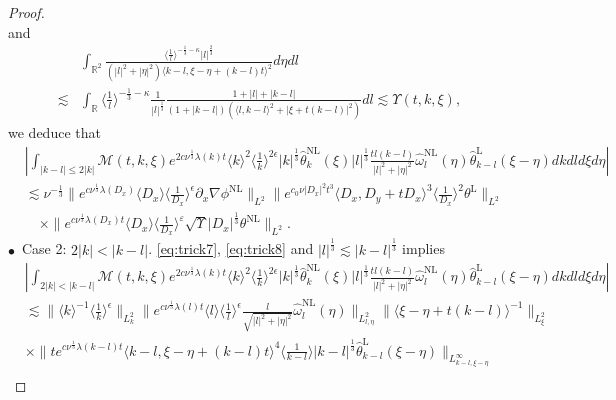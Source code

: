 \documentclass[reqno, 12pt]{amsart} %
\theoremstyle{plain} %
\theoremstyle{definition}
\theoremstyle{remark}
\numberwithin{equation}{section} %
\begin{document}
\begin{proof}
$$		$$
		and
		$$
		\begin{aligned}
			& \int_{\mathbb{R}^2} \frac{\langle\frac{1}{l}\rangle^{-\frac13 - \kappa}  |l|^\frac23 }{\left(|l|^2+|\eta|^2\right)\langle k-l, \xi-\eta+(k-l) t\rangle^2} d \eta d l \\
			\lesssim & \int_{\mathbb{R}}\langle\frac{1}{l}\rangle^{-\frac13 - \kappa} \frac{1}{|l|^\frac13 } \frac{1+|l|+|k-l|}{(1+|k-l|)\left(\langle l, k-l\rangle^2+|\xi+t(k-l)|^2\right)} d l 
			\lesssim \Upsilon(t, k, \xi),
		\end{aligned}
		$$
		we deduce that 
		\begin{align*}
			& \left|\int_{|k-l| \leq 2|k|} \mathcal{M}(t, k, \xi) e^{2 c \nu^{\frac{1}{3}} \lambda(k) t}\langle k\rangle^2\langle\frac{1}{k}\rangle^{2 \epsilon} |k|^\frac13\hat{\theta}_k^{\mathrm{NL}}(\xi) |l|^\frac13  \frac{t l(k-l)}{|l|^2+|\eta|^2} \hat{\omega}_l^{\mathrm{NL}}(\eta) \hat{\theta}_{k-l}^{\mathrm{L}}(\xi-\eta) d k d l d \xi d \eta\right| \\
			& \lesssim \nu^{-\frac{1}{3} }\|e^{c \nu^{\frac{1}{3}} \lambda\left(D_x\right)}\langle D_x\rangle\langle\frac{1}{D_x}\rangle^\epsilon \partial_x \nabla \phi^{\mathrm{NL}}\|_{L^2}\|e^{c_0 \nu\left|D_x\right|^2 t^3}\langle D_x, D_y+t D_x\rangle^3\langle\frac{1}{D_x}\rangle^2 \theta^{\mathrm{L}}\|_{L^2} \\
			& \quad \times \| e^{c \nu^\frac13 \lambda\left(D_x\right) t} 
			\langle D_x\rangle\langle\frac{1}{D_x}\rangle^{\varepsilon} \sqrt{\Upsilon } |D_x|^\frac13 \theta^{\mathrm{NL}} \|_{L^2} .
		\end{align*}
		$\bullet$~Case 2:  $2|k|<|k-l|$.  \eqref{eq:trick7}, \eqref{eq:trick8} and $|l|^\frac13 \lesssim |k-l|^\frac13 $ implies
		\begin{align*}
			& \left|\int_{2|k|<|k-l|}\mathcal{M}(t, k, \xi) e^{2 c \nu^{\frac{1}{3}} \lambda(k) t}\langle k\rangle^2\langle\frac{1}{k}\rangle^{2 \epsilon} |k|^\frac13\hat{\theta}_k^{\mathrm{NL}}(\xi) |l|^\frac13  \frac{t l(k-l)}{|l|^2+|\eta|^2} \hat{\omega}_l^{\mathrm{NL}}(\eta) \hat{\theta}_{k-l}^{\mathrm{L}}(\xi-\eta) d k d l d \xi d \eta\right| \\
			& \lesssim\|\langle k\rangle^{-1}\langle\frac{1}{k}\rangle^\epsilon\|_{L_k^2}\|e^{c \nu^{\frac{1}{3}} \lambda(l) t}\langle l\rangle\langle\frac{1}{l}\rangle^\epsilon \frac{l}{\sqrt{|l|^2+|\eta|^2}} \hat{\omega}_l^{\mathrm{NL}}(\eta)\|_{L_{l, \eta}^2}\|\langle\xi-\eta+t(k-l)\rangle^{-1}\|_{L_{\xi}^2} \\
			& \times\|t e^{c \nu^{\frac{1}{3}} \lambda(k-l) t}\langle k-l, \xi-\eta+(k-l) t\rangle^4\langle\frac{1}{k-l}\rangle |k-l|^\frac13 \hat{\theta}_{k-l}^{\mathrm{L}}(\xi-\eta)\|_{L_{k-l, \xi-\eta}^{\infty}} \\

\end{align*}
\end{proof}
\end{document}

